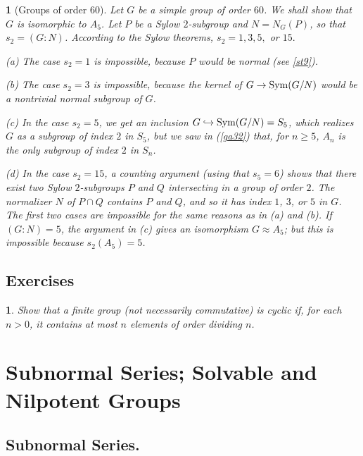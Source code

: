 \documentclass[a4paper,11pt,final,openany]{memoir}%
\newtheorem{plain}[X]{}
\newtheorem{exercise}[Y]{}
\theoremstyle{nonumberplain}
\begin{document}
\begin{plain}
[Groups of order 60]\label{st21}%
%
Let $G$ be a simple group of order $60$. We shall show that $G$ is isomorphic
to $A_{5}$. Let $P$ be a Sylow $2$-subgroup and $N=N_{G}(P)$, so that
$s_{2}=(G:N)$. According to the Sylow theorems, $s_{2}=1,3,5,$ or $15.$

(a) The case $s_{2}=1$ is impossible, because $P$ would be normal (see
\ref{st9}).

(b) The case $s_{2}=3$ is impossible, because the kernel of $G\rightarrow
\operatorname{Sym}(G/N)$ would be a nontrivial normal subgroup of $G$.

(c) In the case $s_{2}=5$, we get an inclusion $G\hookrightarrow
\operatorname{Sym}(G/N)=S_{5}$, which realizes $G$ as a subgroup of index $2$ in $S_{5}$,
but we saw in (\ref{ga32}) that, for $n\geq5$, $A_{n}$ is the only subgroup of
index $2$ in $S_{n}$.

(d) In the case $s_{2}=15$, a counting argument (using that $s_{5}=6$) shows
that there exist two Sylow $2$-subgroups $P$ and $Q$ intersecting in a group
of order $2$. The normalizer $N$ of $P\cap Q$ contains $P$ and $Q$, and so it
has index $1$, $3$, or $5$ in $G$. The first two cases are impossible for the
same reasons as in (a) and (b). If $(G\colon N)=5$, the argument in (c) gives
an isomorphism $G\approx A_{5}$; but this is impossible because $s_{2}%
(A_{5})=5$.
\end{plain}

\section{Exercises}

\begin{exercise}
\label{x81}Show that a finite group (\textit{not} necessarily commutative) is
cyclic if, for each $n>0$, it contains at most $n$ elements of order dividing
$n$.
\end{exercise}

\clearpage


\chapter{Subnormal Series; Solvable and Nilpotent Groups}

\section{Subnormal Series.}
\end{document}
